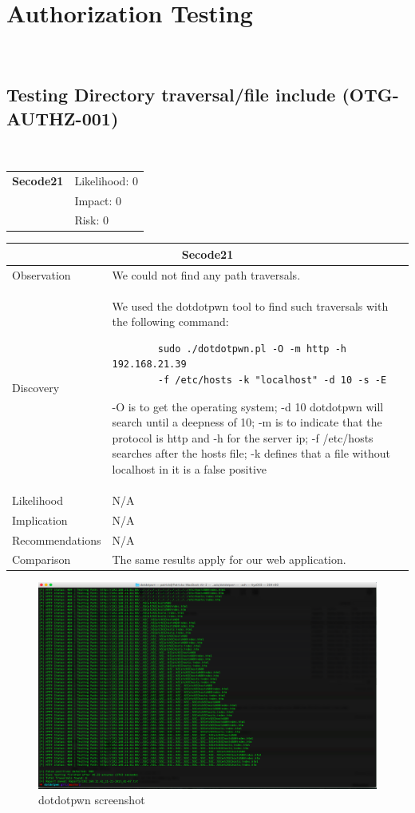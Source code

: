 \documentclass[headsepline,footsepline,footinclude=false,oneside,fontsize=11pt,paper=a4,listof=totoc,bibliography=totoc]{scrbook} %
\begin{document}
\pagebreak
\section{Authorization Testing}\
\subsection{Testing Directory traversal/file include (OTG-AUTHZ-001)}\

\begin{tabular}{cR{12cm}}
	\textbf{Secode21} & Likelihood: 0\\& Impact: 0\\& Risk: 0
\end{tabular}

\begin{tabular}{ l|p{11cm}  }
	\hline
	\multicolumn{2}{c}{\textbf{Secode21}} \\
	\hline
	Observation   & We could not find any path traversals. \\
	Discovery  & We used the dotdotpwn tool to find such traversals with the following command:
	\begin{lstlisting}
		sudo ./dotdotpwn.pl -O -m http -h 192.168.21.39
		-f /etc/hosts -k "localhost" -d 10 -s -E
	\end{lstlisting}
	-O is to get the operating system; -d 10 dotdotpwn will search until a deepness of 10;
	-m is to indicate that the protocol is http and -h for the server ip; -f /etc/hosts searches
	after the hosts file; -k defines that a file without localhost in it is a false positive\\
	Likelihood & N/A \\
	Implication    & N/A \\
	Recommendations & N/A \\
	Comparison & The same results apply for our web application.\\
	\hline
\end{tabular}

\pagebreak

\begin{figure}
	\centering
	\includegraphics[width=\textwidth]{data/dotdotpwn.png}
	\caption{dotdotpwn screenshot}
	\label{fig:dotdotpwn}
\end{figure}
\end{document}
